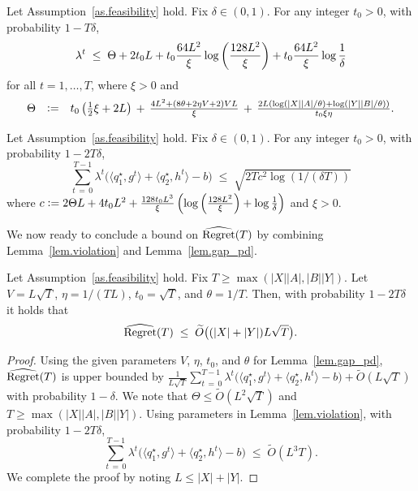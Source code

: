\documentclass[12pt, final]{l4dc2023}
\begin{document}
\begin{lemma}\label{lem.lambda}
	Let Assumption~\ref{as.feasibility} hold. 
	Fix $\delta\in (0,1)$. For any integer $t_0>0$, with probability $1-T\delta$,
	\[
	\lambda^t \; \leq\; \displaystyle \Theta + 2 t_0 L + t_0 \frac{64 L^2}{\xi} \log \rbr{\frac{128 L^2}{\xi}} + t_0 \frac{64 L^2}{\xi} \log\frac{1}{\delta}
	\]
	for all $t = 1,\ldots,T$, where $\xi >0$ and
	\[
	\begin{array}{rcl}
	\Theta &\DefinedAs& t_0
	\rbr{\tfrac{1}{2}\xi  +2 L} \,+\,\tfrac{4L^2 + (8\theta +2\eta V
		+2 )VL}{\xi}
	\,+\,\tfrac{2L (\log(|X||A|/\theta)+\log(|Y||B|/\theta)) }{t_0\xi\eta}.
	\end{array}
	\]
\end{lemma}

\begin{lemma}\label{lem.violation}
	Let Assumption~\ref{as.feasibility} hold.
	Fix $\delta\in (0,1)$. 
	For any integer $t_0>0$, with probability $1-2T\delta$,
	\[
	\sum_{t\,=\,0}^{T-1}
	\lambda^{t} \big(\langle{ q_1^\star},{g^{t}}\rangle 
	+ \langle{ q_2^\star},{h^{t}}\rangle -b\big)
	\;\leq\; \sqrt{2T c^2 \log (1/(\delta T))}
	\]
	where
	$c \DefinedAs  2\Theta L + 4 t_0 L^2 + \tfrac{128 t_0 L^3}{\xi} \rbr{\log \rbr{\tfrac{128 L^2}{\xi}} +\log\tfrac{1}{\delta}}$ 
	and
	$\xi >0$. 
\end{lemma}

We now ready to conclude a bound on ${\hat{\text{\normalfont Regret}}(T)}$ by combining Lemma~\ref{lem.violation} and Lemma~\ref{lem.gap_pd}.
\begin{theorem}\label{thm.regret_hat}
	Let Assumption~\ref{as.feasibility} hold. Fix $T\geq \max(|X||A|,|B||Y|)$. Let $V=L\sqrt{T}$, $\eta = 1/(TL)$, $t_0=\sqrt{T}$, and $\theta = 1/T$. Then,
	with probability $1-2T\delta$ it holds that
	\[
	{\hat{\text{\normalfont Regret}}(T)}\;\leq\;
	\tilde O \big({(|X|+|Y|) L \sqrt T}\big).
	\]
\end{theorem}
\begin{proof} 
	Using the given parameters $V$, $\eta$, $t_0$, and $\theta$ for Lemma~\ref{lem.gap_pd}, ${\hat{\text{\normalfont Regret}}(T)}$ is upper bounded by 
	$\frac{1}{L\sqrt{T}}
	\sum_{t\,=\,0}^{T-1}
	\lambda^{t} \big(\langle{ q_1^\star},{g^{t}}\rangle 
	+ \langle{ q_2^\star},{h^{t}}\rangle -b\big)
	+ \tilde O(L\sqrt{T })$
	with probability $1-\delta$.
	We note that $\Theta\leq	\tilde O(L^2\sqrt{T})$ and $T\geq \max(|X||A|,|B||Y|)$.	
	Using parameters in Lemma~\ref{lem.violation}, with probability $1-2T\delta$,
	\[
	\sum_{t\,=\,0}^{T-1}
	\lambda^{t} \big(\langle{ q_1^\star},{g^{t}}\rangle 
	+ \langle{ q_2^\star},{h^{t}}\rangle -b\big)
	\;\leq\; \tilde O(L^3 T).
	\] 
	We complete the proof by noting $L\leq |X|+|Y|$. 
\end{proof}
\end{document}
